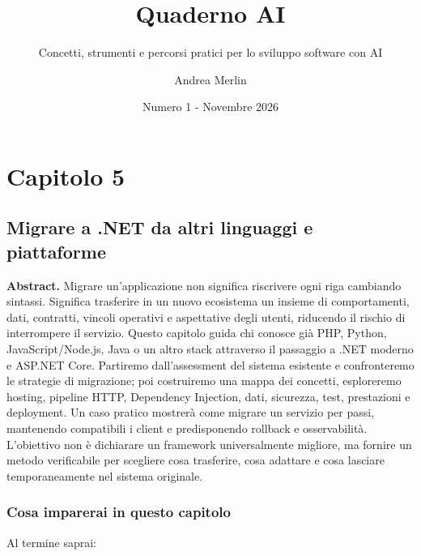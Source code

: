 \documentclass[
  italian,
  10pt,
]{book}
\title{Quaderno AI}
\subtitle{Concetti, strumenti e percorsi pratici per lo sviluppo
software con AI}
\author{Andrea Merlin}
\date{Numero 1 - Novembre 2026}
\begin{document}
\frontmatter
\maketitle

{
\setcounter{tocdepth}{1}
\tableofcontents
}
\mainmatter
\chapter{Capitolo 5}\label{capitolo-5}

\section{Migrare a .NET da altri linguaggi e
piattaforme}\label{migrare-a-.net-da-altri-linguaggi-e-piattaforme}

\textbf{Abstract.} Migrare un'applicazione non significa riscrivere ogni
riga cambiando sintassi. Significa trasferire in un nuovo ecosistema un
insieme di comportamenti, dati, contratti, vincoli operativi e
aspettative degli utenti, riducendo il rischio di interrompere il
servizio. Questo capitolo guida chi conosce già PHP, Python,
JavaScript/Node.js, Java o un altro stack attraverso il passaggio a .NET
moderno e ASP.NET Core. Partiremo dall'assessment del sistema esistente
e confronteremo le strategie di migrazione; poi costruiremo una mappa
dei concetti, esploreremo hosting, pipeline HTTP, Dependency Injection,
dati, sicurezza, test, prestazioni e deployment. Un caso pratico
mostrerà come migrare un servizio per passi, mantenendo compatibili i
client e predisponendo rollback e osservabilità. L'obiettivo non è
dichiarare un framework universalmente migliore, ma fornire un metodo
verificabile per scegliere cosa trasferire, cosa adattare e cosa
lasciare temporaneamente nel sistema originale.

\subsection{Cosa imparerai in questo
capitolo}\label{cosa-imparerai-in-questo-capitolo}

Al termine saprai:
\end{document}

